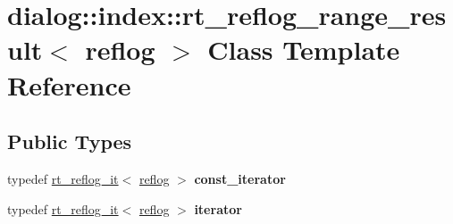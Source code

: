 \hypertarget{classdialog_1_1index_1_1rt__reflog__range__result}{}\section{dialog\+:\+:index\+:\+:rt\+\_\+reflog\+\_\+range\+\_\+result$<$ reflog $>$ Class Template Reference}
\label{classdialog_1_1index_1_1rt__reflog__range__result}
\subsection*{Public Types}
\begin{DoxyCompactItemize}
\item 
\mbox{\label{classdialog_1_1index_1_1rt__reflog__range__result_ad5b12252db7cd3484f5970f982a6967d}} 
typedef \hyperlink{classdialog_1_1index_1_1rt__reflog__it}{rt\+\_\+reflog\+\_\+it}$<$ \hyperlink{classdialog_1_1monolog_1_1monolog__exp2__linear}{reflog} $>$ {\bfseries const\+\_\+iterator}
\item 
\mbox{\label{classdialog_1_1index_1_1rt__reflog__range__result_a3d38e06b2b726d22a58fa68623b2d8b9}} 
typedef \hyperlink{classdialog_1_1index_1_1rt__reflog__it}{rt\+\_\+reflog\+\_\+it}$<$ \hyperlink{classdialog_1_1monolog_1_1monolog__exp2__linear}{reflog} $>$ {\bfseries iterator}
\end{DoxyCompactItemize}
